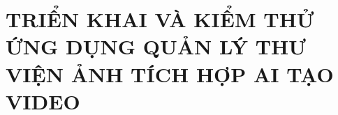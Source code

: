 \chapter{TRIỂN KHAI VÀ KIỂM THỬ ỨNG DỤNG QUẢN LÝ THƯ VIỆN ẢNH TÍCH HỢP AI TẠO VIDEO}
\label{chap:experiment}







